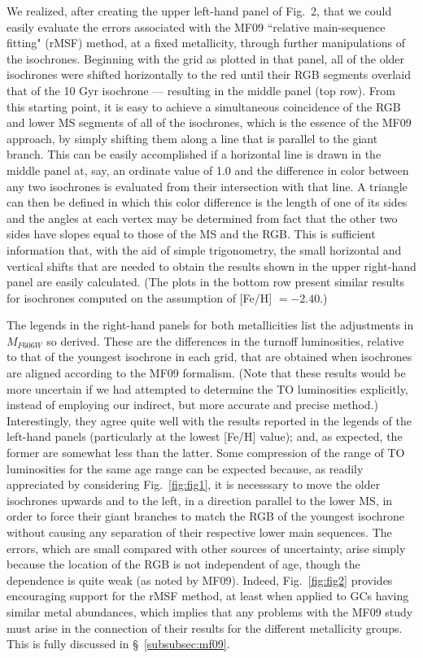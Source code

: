 \documentclass[12pt,preprint]{aastex}
\begin{document}
We realized, after creating the upper left-hand panel of Fig.~2, that we could
easily evaluate the errors associated with the MF09 ``relative main-sequence
fitting" (rMSF) method, at a fixed metallicity, through further manipulations of
the isochrones.  Beginning with the grid as plotted in that panel, all of the
older isochrones were shifted horizontally to the red until their RGB segments
overlaid that of the 10 Gyr isochrone --- resulting in the middle panel (top
row).  From this starting point, it is easy to achieve a simultaneous
coincidence of the RGB and lower MS segments of all of the isochrones, which is
the essence of the MF09 approach, by simply shifting them along a line that is
parallel to the giant branch.  This can be easily accomplished if a horizontal
line is drawn in the middle panel at, say, an ordinate value of 1.0 and the
difference in color between any two isochrones is evaluated from their
intersection with that line.  A triangle can then be defined in which this color
difference is the length of one of its sides and the angles at each vertex may
be determined from fact that the other two sides have slopes equal to those of
the MS and the RGB.  This is sufficient information that, with the aid of simple
trigonometry, the small horizontal and vertical shifts that are needed to obtain
the results shown in the upper right-hand panel are easily calculated.  (The
plots in the bottom row present similar results for isochrones computed on the
assumption of [Fe/H] $= -2.40$.)

The legends in the right-hand panels for both metallicities list the adjustments
in $M_{F606W}$ so derived.  These are the differences in the turnoff
luminosities, relative to that of the youngest isochrone in each grid, that are
obtained when isochrones are aligned according to the MF09 formalism.  (Note
that these results would be more uncertain if we had attempted to determine the
TO luminosities explicitly, instead of employing our indirect, but more accurate
and precise method.)  Interestingly, they agree quite well with the results
reported in the legends of the left-hand panels (particularly at the lowest
[Fe/H] value); and, as expected, the former are somewhat less than the latter.
Some compression of the range of TO luminosities for the same age range can be
expected because, as readily appreciated by considering Fig.~\ref{fig:fig1},
it is necesssary to move the older isochrones upwards and to the left, in a
direction parallel to the lower MS, in order to force their giant branches to
match the RGB of the youngest isochrone without causing any separation of their
respective lower main sequences.  The errors, which are small compared with
other sources of uncertainty, arise simply because the location of the RGB is
not independent of age, though the dependence is quite weak (as noted by MF09).
Indeed, Fig.~\ref{fig:fig2} provides encouraging support for the rMSF method,
at least when applied to GCs having similar metal abundances, which implies that
any problems with the MF09 study must arise in the connection of their results
for the different metallicity groups.  This is fully discussed in
\S~\ref{subsubsec:mf09}.
\end{document}
